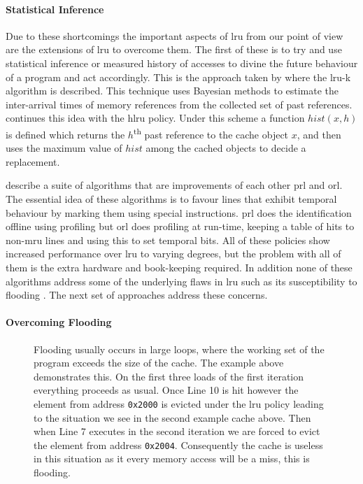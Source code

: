 \paragraph{Statistical Inference}

Due to these shortcomings the important aspects of \gls{lru} from our point of view are the extensions of \gls{lru} to overcome them. The first of these is to try and use statistical inference or measured history of accesses to divine the future behaviour of a program and act accordingly. This is the approach taken by \citet{oneilLRUKPageReplacement1993} where the \gls{lru-k} algorithm is described. This technique uses Bayesian methods to estimate the inter-arrival times of memory references from the collected set of past references. \citet{vakaliLRUbasedAlgorithmsWeb2000} continues this idea with the \gls{hlru} policy. Under this scheme a function $hist(x,h)$ is defined which returns the $h$\textsuperscript{th} past reference to the cache object $x$, and then uses the maximum value of $hist$ among the cached objects to decide a replacement.

\citet{wongModifiedLRUPolicies2000} describe a suite of algorithms that are improvements of each other \gls{prl} and \gls{orl}. The essential idea of these algorithms is to favour lines that exhibit temporal behaviour by marking them using special instructions. \gls{prl} does the identification offline using profiling but \gls{orl} does profiling at run-time, keeping a table of hits to non-\gls{mru} lines and using this to set temporal bits. All of these policies show increased performance over \gls{lru} to varying degrees, but the problem with all of them is the extra hardware and book-keeping required. In addition none of these algorithms address some of the underlying flaws in \gls{lru} such as its susceptibility to flooding \cite{glassAdaptivePageReplacement1997}. The next set of approaches address these concerns.

\paragraph{Overcoming Flooding}

\begin{figure}[ht]
	
	\caption[Flooding Example]{Flooding usually occurs in large loops, where the working set of the program exceeds the size of the cache. The example above demonstrates this. On the first three loads of the first iteration everything proceeds as usual. Once Line 10 is hit however the element from address \texttt{0x2000} is evicted under the \gls{lru} policy leading to the situation we see in the second example cache above. Then when Line 7 executes in the second iteration we are forced to evict the element from address \texttt{0x2004}. Consequently the cache is useless in this situation as it every memory access will be a miss, this is flooding.}
	\label{fig:flooding}
\end{figure}

